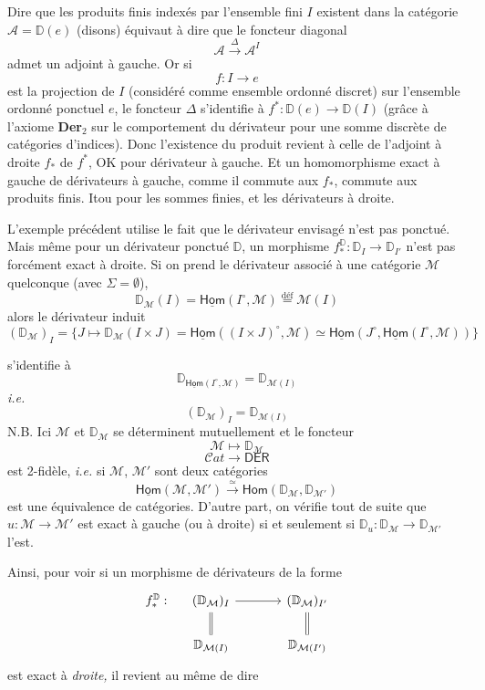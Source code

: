 \documentclass[11pt]{article}
\newcommand{\printedpage}[1]{\marginpar{\footnotesize p.~#1}}
\newcommand{\msp}[1]{\marginpar{\footnotesize [#1]}}
\newcommand{\D}{\mathbb{D}}
\newcommand{\uHom}{\underline{\mathsf{Hom}}}
\newcommand{\sHom}{\mathsf{Hom}}
\newcommand{\DER}{\mathsf{DER}}
\newcommand{\Cat}{\mathcal{C}at}
\begin{document}
\printedpage{18}

\msp{page 26}

Dire que les produits finis indexés par l'ensemble fini $I$ existent dans la catégorie $\mathcal{A} = \D(e)$ (disons) équivaut à dire que le foncteur diagonal
\[
\mathcal{A} \xrightarrow{\Delta} \mathcal{A}^I
\]
admet un adjoint à gauche. Or si
\[
f : I \to e
\]
est la projection de $I$ (considéré comme ensemble ordonné discret) sur l'ensemble ordonné ponctuel $e$, le foncteur $\Delta$ s'identifie à $f^* : \D(e) \to \D(I)$ (grâce à l'axiome \textbf{Der}$_2$ sur le comportement du dérivateur pour une somme discrète de catégories d'indices). Donc l'existence du produit revient à celle de l'adjoint à droite $f_*$ de $f^*$, OK pour dérivateur à gauche. Et un homomorphisme exact à gauche de dérivateurs à gauche, comme il commute aux $f_*$, commute aux produits finis. Itou pour les sommes finies, et les dérivateurs à droite.

L'exemple précédent utilise le fait que le dérivateur envisagé n'est pas ponctué. Mais même pour un dérivateur ponctué $\D$, un morphisme $f^{\D}_* : \D_I \to \D_{I'}$ n'est pas forcément exact à droite. Si on prend le dérivateur associé à une catégorie $\mathcal{M}$ quelconque (avec $\Sigma = \emptyset$),
\[
\D_{\mathcal{M}}(I) = \uHom(I^\circ,\mathcal{M}) \overset{\text{déf}}{=} \mathcal{M}(I)
\]
alors le dérivateur induit
\[
(\D_{\mathcal{M}})_I = \{J \mapsto \D_{\mathcal{M}}(I \times J) = \uHom((I \times J)^\circ,\mathcal{M}) \simeq \uHom(J^\circ,\uHom(I^\circ,\mathcal{M}))\}
\]

\msp{page 27}

s'identifie à
\[
\D_{\uHom(I^\circ,\mathcal{M})} = \D_{\mathcal{M}(I)}
\]
\textit{i.e.}
\[
(\D_{\mathcal{M}})_I = \D_{\mathcal{M}(I)}
\]
N.B. Ici $\mathcal{M}$ et $\D_{\mathcal{M}}$ se déterminent mutuellement et le foncteur
\[
\mathcal{M} \longmapsto \D_{\mathcal{M}}
\]
\[
\Cat \longrightarrow \DER
\]
est 2-fidèle, \textit{i.e.} si $\mathcal{M}$, $\mathcal{M}'$ sont deux catégories
\[
\uHom(\mathcal{M},\mathcal{M}') \xrightarrow{\simeq} \sHom(\D_{\mathcal{M}},\D_{\mathcal{M}'})
\]
est une équivalence de catégories. D'autre part, on vérifie tout de suite que $u : \mathcal{M} \to \mathcal{M}'$ est exact à gauche (ou à droite) si et seulement si $\D_u : \D_{\mathcal{M}} \to \D_{\mathcal{M}'}$ l'est.

Ainsi, pour voir si un morphisme de dérivateurs de la forme
\[
\begin{tikzcd}[column sep=large, row sep=normal]
f^{\D}_* : &[-2.5em] (\D_{\mathcal{M}})_I \arrow[r] \arrow[d, equal] & (\D_{\mathcal{M}})_{I'} \arrow[d, equal] \\
& \D_{\mathcal{M}(I)} & \D_{\mathcal{M}(I')}
\end{tikzcd}
\]
est exact à \textit{droite,} il revient au même de dire
\end{document}
